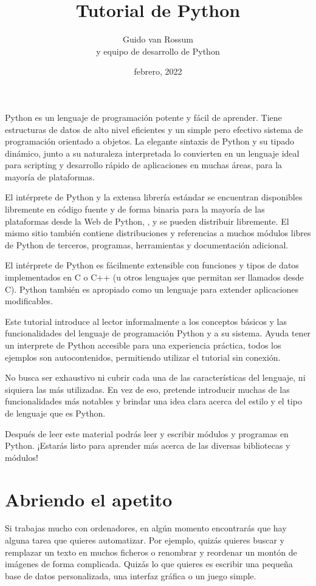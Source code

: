\documentclass[a5paper,10pt,spanish]{sphinxmanual}
\title{Tutorial de Python}
\date{febrero, 2022}
\author{Guido van Rossum\\y equipo de desarrollo de Python}
\begin{document}
\pagestyle{empty}
\pagestyle{plain}
\sphinxtableofcontents
\pagestyle{normal}
\label{\detokenize{tutorial/index::doc}}


\sphinxAtStartPar
Python es un lenguaje de programación potente y fácil de aprender. Tiene estructuras de datos de alto nivel eficientes y un simple pero efectivo sistema de programación orientado a objetos. La elegante sintaxis de Python y su tipado dinámico, junto a su naturaleza interpretada lo convierten en un lenguaje ideal para scripting y desarrollo rápido de aplicaciones en muchas áreas, para la mayoría de plataformas.

\sphinxAtStartPar
El intérprete de Python y la extensa librería estándar se encuentran disponibles libremente en código fuente y de forma binaria para la mayoría de las plataformas desde la Web de Python, , y se pueden distribuir libremente. El mismo sitio también contiene distribuciones y referencias a muchos módulos libres de Python de terceros, programas, herramientas y documentación adicional.

\sphinxAtStartPar
El intérprete de Python es fácilmente extensible con funciones y tipos de datos implementados en C o C++ (u otros lenguajes que permitan ser llamados desde C). Python también es apropiado como un lenguaje para extender aplicaciones modificables.

\sphinxAtStartPar
Este tutorial introduce al lector informalmente a los conceptos básicos y las funcionalidades del lenguaje de programación Python y a su sistema. Ayuda tener un interprete de Python accesible para una experiencia práctica, todos los ejemplos son auto\sphinxhyphen{}contenidos, permitiendo utilizar el tutorial sin conexión.

\sphinxAtStartPar
No busca ser exhaustivo ni cubrir cada una de las características del lenguaje, ni siquiera las más utilizadas. En vez de eso, pretende introducir muchas de las funcionalidades más notables y brindar una idea clara acerca del estilo y el tipo de lenguaje que es Python. 

\sphinxAtStartPar
Después de leer este material podrás leer y escribir módulos y programas en Python. ¡Estarás listo para aprender más acerca de las diversas bibliotecas y módulos!


\chapter{Abriendo el apetito}
\label{\detokenize{tutorial/appetite:whetting-your-appetite}}\label{\detokenize{tutorial/appetite:tut-intro}}\label{\detokenize{tutorial/appetite::doc}}
\sphinxAtStartPar
Si trabajas mucho con ordenadores, en algún momento encontrarás que hay alguna tarea que quieres automatizar. Por ejemplo, quizás quieres buscar y remplazar un texto en muchos ficheros o renombrar y reordenar un montón de imágenes de forma complicada. Quizás lo que quieres es escribir una pequeña base de datos personalizada, una interfaz gráfica o un juego simple.
\end{document}
